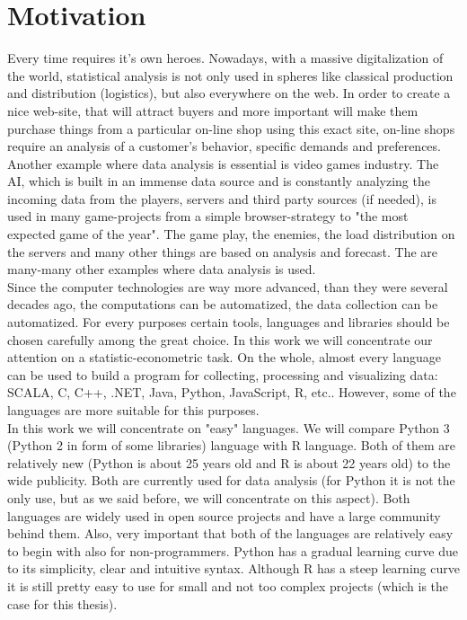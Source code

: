 \documentclass{article}
\begin{document}
\newpage
\section{Motivation}
Every time requires it's own heroes. Nowadays, with a massive digitalization of the world, statistical analysis is not only used in spheres like classical production and distribution (logistics), but also everywhere on the web. In order to create a nice web-site, that will attract buyers and more important will make them purchase things from a particular on-line shop using this exact site, on-line shops require an analysis of a customer's behavior, specific demands and preferences. Another example where data analysis is essential is video games industry. The AI, which is built in an immense data source and is constantly analyzing the incoming data from the players, servers and third party sources (if needed), is used in many game-projects from a simple browser-strategy to "the most expected game of the year". The game play, the enemies, the load distribution on the servers and many other things are based on analysis and forecast. The are many-many other examples where data analysis is used.\vspace{3mm}\\
Since the computer technologies are way more advanced, than they were several decades ago, the computations can be automatized, the data collection can be automatized. For every purposes certain tools, languages and libraries should be chosen carefully among the great choice. In this work we will concentrate our attention on a statistic-econometric task. On the whole, almost every language can be used to build a program for collecting, processing and visualizing data: SCALA, C, C++, .NET, Java, Python, JavaScript, R, etc.. However, some of the languages are more suitable for this purposes.\vspace{3mm}\\
In this work we will concentrate on "easy" languages. We will compare Python 3 (Python 2 in form of some libraries) language with R language. Both of them are relatively new (Python is about 25 years old and R is about 22 years old) to the wide publicity. Both are currently used for data analysis (for Python it is not the only use, but as we said before, we will concentrate on this aspect). Both languages are widely used in open source projects and have a large community behind them. Also, very important that both of the languages are relatively easy to begin with also for non-programmers. Python has a gradual learning curve due to its simplicity, clear and intuitive syntax. Although R has a steep learning curve it is still pretty easy to use for small and not too complex projects (which is the case for this thesis).
\end{document}
